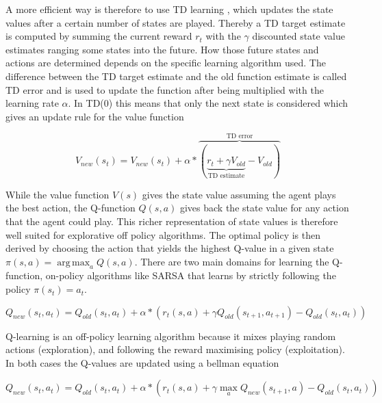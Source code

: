 \documentclass[10pt]{reportMaster}
\DeclareMathOperator*{\argmax}{arg\,max}
\begin{document}
A more efficient way is therefore to use \ac{TD} learning \cite{sutton1988learning}, which updates the state values after a certain number of states are played. Thereby a \ac{TD} target estimate is computed by summing the current reward $r_{t}$ with the $\gamma$ discounted state value estimates ranging some states into the future. How those future states and actions are determined depends on the specific learning algorithm used. The difference between the \ac{TD} target estimate and the old function estimate is called \ac{TD} error and is used to update the function after being multiplied with the learning rate $\alpha$. In TD(0) this means that only the next state is considered which gives an update rule for the value function

\begin{equation}
\label{eq:bellman update value function}
V_{new}(s_{t})= V_{new}(s_{t}) + \alpha * \overbrace{(\underbrace{r_{t} + \gamma V_{old}}_{\text{TD estimate}} - V_{old})}^{\text{TD error}}
\end{equation}

While the value function $V(s)$ gives the state value assuming the agent plays the best action, the Q-function $Q(s, a)$ gives back the state value for any action that the agent could play. This richer representation of state values is therefore well suited for explorative off policy algorithms. The optimal policy is then derived by choosing the action that yields the highest Q-value in a given state $\pi(s, a)=\argmax_{a}Q(s, a)$. There are two main domains for learning the Q-function, on-policy algorithms like \ac{SARSA} \cite{rummery1994line} that learns by strictly following the policy $\pi(s_{t})=a_{t}$.

\begin{equation}
\label{eq:bellman update SARSA}
Q_{new}(s_{t}, a_{t})= Q_{old}(s_{t}, a_{t}) + \alpha * (r_{t}(s, a) + \gamma Q_{old}(s_{t+1}, a_{t+1}) - Q_{old}(s_{t}, a_{t}))
\end{equation}


Q-learning \cite{watkins1992q} is an off-policy learning algorithm because it mixes playing random actions (exploration), and following the reward maximising policy (exploitation). In both cases the Q-values are updated using a bellman equation 

\begin{equation}
\label{eq:q-learning}
Q_{new}(s_{t}, a_{t})= Q_{old}(s_{t}, a_{t}) + \alpha * (r_{t}(s, a) + \gamma \max_{a}Q_{new}(s_{t+1}, a) - Q_{old}(s_{t}, a_{t}))
\end{equation}
\end{document}
